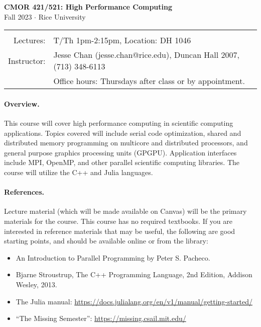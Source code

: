 \documentclass[10pt]{article}
\begin{document}
\vspace*{-5em}
\begin{center}
\large \textbf{CMOR 421/521: High Performance Computing}\\[0.5em]
       {Fall 2023 $\cdot$ Rice University}
\end{center}

\begin{tabular}{rl}
\hline & \\[-.5em]
Lectures:		& T/Th 1pm-2:15pm, Location: DH 1046 \\[.75em]
%
%
Instructor:  	& Jesse Chan (jesse.chan@rice.edu), Duncan Hall 2007, (713) 348-6113 \\
			& Office hours: Thursdays after class or by appointment.\\[.5em]
\end{tabular}

\paragraph{Overview.} This course will cover high performance computing in scientific computing applications. Topics covered will include serial code optimization, shared and distributed memory programming on multicore and distributed processors, and general purpose graphics processing units (GPGPU). Application interfaces include MPI, OpenMP, and other parallel scientific computing libraries. The course will utilize the C++ and Julia languages. 

\paragraph{References.} Lecture material (which will be made available on Canvas) will be the primary materials for the course. This course has no required textbooks. If you are interested in reference materials that may be useful, the following are good starting points, and should be available online or from the library:
\begin{itemize}
\setlength\itemsep{.1em}
\item An Introduction to Parallel Programming by Peter S. Pacheco. 
\item Bjarne Stroustrup, The C++ Programming Language, 2nd Edition, Addison Wesley, 2013.
\item The Julia manual: \url{https://docs.julialang.org/en/v1/manual/getting-started/}
\item ``The Missing Semester'': \url{https://missing.csail.mit.edu/}
\end{itemize}
\end{document}
